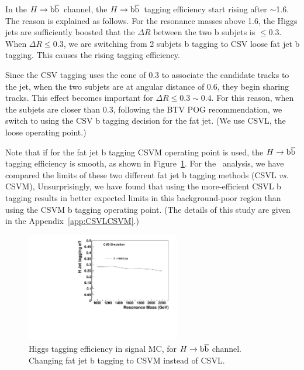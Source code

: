 In the $H\to\mathrm{b\overline{b}}$~channel, the $H\to\mathrm{b\overline{b}}$~tagging efficiency start rising 
after $\sim$1.6\TeVcc. The reason is explained as follows.  
For the resonance masses above 1.6\TeVcc, the Higgs
jets are sufficiently boosted that the $\Delta R$ between the two b
subjets is $\le 0.3$. When $\Delta R \leq 0.3$, we are switching from 2 subjets
b tagging to CSV loose fat jet b tagging.  This causes the rising tagging efficiency. 

Since the CSV tagging uses the cone of $0.3$ to
associate the candidate tracks to the jet, when the two subjets are at
angular distance of $0.6$, they begin sharing tracks. 
This effect becomes important for $\Delta R \le 0.3\sim0.4$.  For this
reason, when the subjets are closer than $0.3$, following the BTV POG
recommendation, we switch to using the CSV b tagging decision for the
fat jet. (We use CSVL, the loose operating point.)

Note that if for the fat jet b tagging CSVM operating point is used,
the $H\to\mathrm{b\overline{b}}$ tagging efficiency is smooth, as shown in
Figure~\ref{fig:fatCSVM}.  For the \HbbZqq\ analysis, we have compared
the limits of these two different fat jet b tagging methods (CSVL 
{\it vs.} CSVM), Unsurprisingly, we have found that using the
more-efficient CSVL b tagging results in better expected limits in
this background-poor region than using the CSVM b tagging operating
point. (The details of this study are given in the Appendix~\ref{app:CSVLCSVM}.)



\begin{figure}[htb]
\begin{center}
\includegraphics[width=0.60\textwidth]{EXO-14-009/HbbZqqfigs/Signal/H-taggingEff-8TeV-CSVM.pdf}
\end{center}
\caption{
  Higgs tagging efficiency in signal MC, for $H\to\mathrm{b\overline{b}}$ channel.  
  Changing fat jet b tagging to CSVM instead of CSVL. 
}
\label{fig:fatCSVM}
\end{figure}

